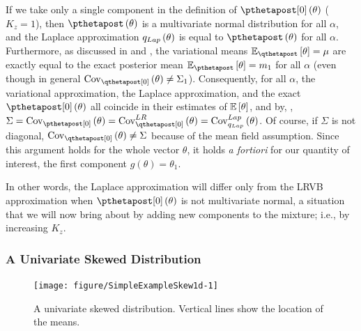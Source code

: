 \documentclass{article}\usepackage[]{graphicx}\usepackage[]{color}
\newenvironment{knitrout}{}{}
\theoremstyle{definition}
\theoremstyle{plain}
\theoremstyle{plain}
\theoremstyle{plain}
\theoremstyle{definition}
\theoremstyle{plain}
\theoremstyle{plain}
\begin{document}
If we take only a single component in the definition of
$\pzeropost\left(\theta\right)$ ($K_{z}=1$), then
$\pthetapost\left(\theta\right)$ is a multivariate normal distribution for all
$\alpha$, and the Laplace approximation $q_{Lap}\left(\theta\right)$ is equal to
$\pthetapost\left(\theta\right)$ for all $\alpha$. Furthermore, as discussed in
 and , the variational means
$\mbe_{\qthetapost}\left[\theta\right]=\mu$ are exactly equal to the exact
posterior mean $\mbe_{\pthetapost}\left[\theta\right]=m_{1}$ for all $\alpha$
(even though in general $\qcov\left(\theta\right)\ne\Sigma_{1}$). Consequently,
for all $\alpha$, the variational approximation, the Laplace approximation, and
the exact $\pzeropost\left(\theta\right)$ all coincide in their estimates of
$\mathbb{E}\left[\theta\right]$, and by, ,
$\Sigma=\pcov\left(\theta\right)=\lrvbcov\left(\theta\right)=\covlap\left(\theta\right)$.
Of course, if $\Sigma$ is not diagonal, $\qcov\left(\theta\right)\ne\Sigma$
because of the mean field assumption. Since this argument holds for the whole
vector $\theta$, it holds \textit{a fortiori} for our quantity of interest, the
first component $g\left(\theta\right)=\theta_{1}$.

In other words, the Laplace approximation will differ only from the
LRVB approximation when $\pzeropost\left(\theta\right)$ is not multivariate
normal, a situation that we will now bring about by adding new components
to the mixture; i.e., by increasing $K_{z}$.

\subsubsection{A Univariate Skewed Distribution}

\begin{knitrout}
\color{fgcolor}\begin{figure}[t]

{\centering \texttt{[image: figure/SimpleExampleSkew1d-1]} 

}

\caption[A univariate skewed distribution]{A univariate skewed distribution. Vertical lines show the location of the means.}\label{fig:SimpleExampleSkew1d}
\end{figure}


\end{knitrout}
\end{document}
